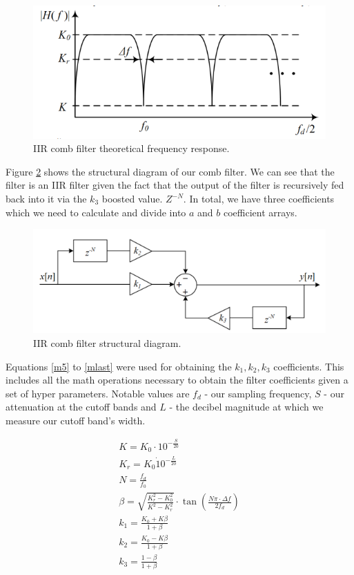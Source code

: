 \documentclass[10pt,a4paper,twocolumn]{article}
\begin{document}
\begin{figure} %
	[!h]
	\centering
	\includegraphics*[width=.80\columnwidth]{comb_theo.png} %
	\caption{IIR comb filter theoretical frequency response.}
	\label{f5}
	\vspace{6pt}
\end{figure}


Figure \ref{f6} shows the structural diagram of our comb filter. We can see that the filter is an IIR filter given the fact that the output of the filter is recursively fed back into it via the $k_3$ boosted value. $Z^{-N}$. In total, we have three coefficients which we need to calculate and divide into $a$ and $b$ coefficient arrays.

\begin{figure} %
	[!h]
	\centering
	\includegraphics*[width=.80\columnwidth]{comb_struct.png} %
	\caption{IIR comb filter structural diagram.}
	\label{f6}
	\vspace{6pt}
\end{figure}

Equations \ref{m5} to \ref{mlast} were used for obtaining the $k_1, k_2, k_3$ coefficients. This includes all the math operations necessary to obtain the filter coefficients given a set of hyper parameters. Notable values are $f_d$ - our sampling frequency, $S$ - our attenuation at the cutoff bands and $L$ - the decibel magnitude at which we measure our cutoff band's width.


\begin{eqnarray}
\label{m5}
K = K_0 \cdot 10^{-\frac{S}{20}} \\
K_r = K_0 \dot 10^{-\frac{L}{20}} \\
N = \frac{f_d}{f_0} \\
\beta = \sqrt{\frac{K_r^2 - K_0^2}{K^2-K_r^2}} \cdot \tan{(\frac{N\pi\cdot \Delta f}{2f_d})} \\
k_1 = \frac{K_0+K\beta}{1+\beta} \\
k_2 = \frac{K_0-K\beta}{1+\beta} \\
k_3 = \frac{1 - \beta}{1+\beta}
\label{mlast}
\end{eqnarray}
\end{document}
